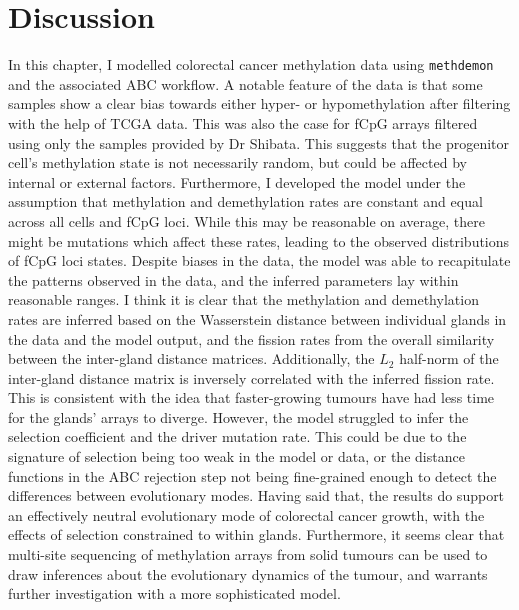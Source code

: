 \section{Discussion}

In this chapter, I modelled colorectal cancer methylation data using
\texttt{methdemon} and the associated ABC workflow. A notable feature of the
data is that some samples show a clear bias towards either hyper- or
hypomethylation after filtering with the help of TCGA data. This was also the
case for fCpG arrays filtered using only the samples provided by Dr Shibata.
This suggests that the progenitor cell's methylation state is not necessarily
random, but could be affected by internal or external factors. Furthermore, I
developed the model under the assumption that methylation and demethylation
rates are constant and equal across all cells and fCpG loci. While this may be
reasonable on average, there might be mutations which affect these rates,
leading to the observed distributions of fCpG loci states. Despite biases in
the data, the model was able to recapitulate the patterns observed in the data,
and the inferred parameters lay within reasonable ranges. I think it is clear
that the methylation and demethylation rates are inferred based on the
Wasserstein distance between individual glands in the data and the model
output, and the fission rates from the overall similarity between the
inter-gland distance matrices. Additionally, the $L_2$ half-norm of the
inter-gland distance matrix is inversely correlated with the inferred fission
rate. This is consistent with the idea that faster-growing tumours have had less
time for the glands' arrays to diverge.
However, the model struggled to infer the selection coefficient and the
driver mutation rate. This could be due to the signature of selection being too
weak in the model or data, or the distance functions in the ABC rejection step
not being fine-grained enough to detect the differences between evolutionary
modes. Having said that, the results do support an effectively neutral
evolutionary mode of colorectal cancer growth, with the effects of selection
constrained to within glands. Furthermore, it seems clear that multi-site
sequencing of methylation arrays from solid tumours can be used to draw
inferences about the evolutionary dynamics of the tumour, and warrants further
investigation with a more sophisticated model.
